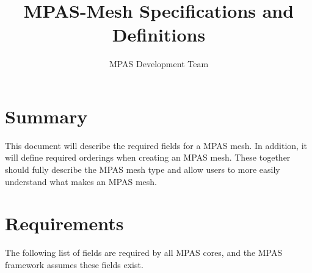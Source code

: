 \documentclass[11pt]{report}
\begin{document}
\title{MPAS-Mesh Specifications and Definitions}
\author{MPAS Development Team}

\maketitle
\tableofcontents


\chapter{Summary}


This document will describe the required fields for a MPAS mesh. In addition, it
will define required orderings when creating an MPAS mesh. These together
should fully describe the MPAS mesh type and allow users to more easily
understand what makes an MPAS mesh.


\chapter{Requirements}

The following list of fields are required by all MPAS cores, and the MPAS framework assumes these fields exist.
\end{document}
